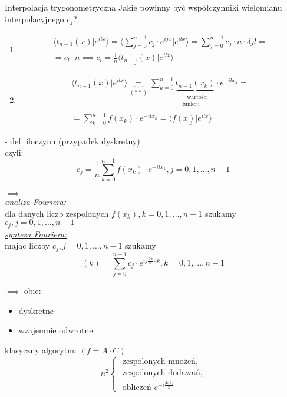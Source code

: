 \begin{frame}[allowframebreaks]{Interpolacja trygonometryczna}
	Jakie powinny być współczynniki wielomianu interpolacyjnego $c_j$?
	\begin{enumerate}[1$^\circ$]
		\item
		\begin{align*}
			\langle t_{n-1}(x)|e^{ilx} \rangle = \Bigg\langle \sum\limits_{j = 0}^{n-1} c_j \cdot e^{ijx} \Bigg|e^{ilx} \Bigg\rangle = \sum\limits_{j = 0}^{n-1} c_j \cdot n \cdot \delta jl = \\ = c_l \cdot n \implies \underline{c_l = \frac{1}{n} \langle t_{n-1}(x)|e^{ilx} \rangle}
			\tag{16.20}
		\end{align*}
		\item
		\begin{align*}
			\langle t_{n-1}(x)|e^{ilx} \rangle \underbrace{=}_{(**)} \sum\limits_{k = 0}^{n-1}  \underbrace{t_{n-1}(x_k)}_{\substack{\text{=wartości} \\  \text{funkcji}}} \cdot e^{-ilx_k} = \\ = \sum\limits_{k = 0}^{n-1} f(x_k) \cdot e^{-ilx_k} = \underline{\langle f(x)|e^{ilx} \rangle}
		\end{align*}
	\end{enumerate}
	- def. iloczynu (przypadek dyskretny) \\
	czyli:
	\[
		\underline{c_j = \frac{1}{n} \sum\limits_{k = 0}^{n-1} f(x_k) \cdot e^{-ilx_k}, j = 0, 1, \dots, n-1}
		\tag{16.21}
	\]
	\begin{flushleft}
		$\implies$ \\
		\underline{\textit{analiza Fouriera:}} \\
		dla danych liczb zespolonych $f(x_k), k = 0, 1,\dots, n - 1$ szukamy $c_j, j = 0, 1, \dots, n-1$ \\
		\bigskip
		\underline{\textit{synteza Fouriera:}} \\
		mając liczby $c_j, j = 0, 1, \dots, n-1$ szukamy
		\[
			(k) = \sum\limits_{j = 0}^{n - 1} c_j \cdot e^{ij\frac{2\pi}{n} \cdot k}, k = 0, 1, \dots, n-1
			\tag{16.22}
		\]
	\end{flushleft}
	\begin{flushleft}
		$\implies$ obie:
		\begin{itemize}
			\item dyskretne
			\item wzajemnie odwrotne
		\end{itemize}
		klasyczny algorytm: $(f = A \cdot C)$
		\[ n^2
		\begin{cases}
			\text{-zespolonych mnożeń,} \\
			\text{-zespolonych dodawań,} \\
			\text{-obliczeń } e^{-i\frac{2\pi kj}{n}}
		\end{cases}
		\tag{16.23}
		\]
	\end{flushleft}	
\end{frame}